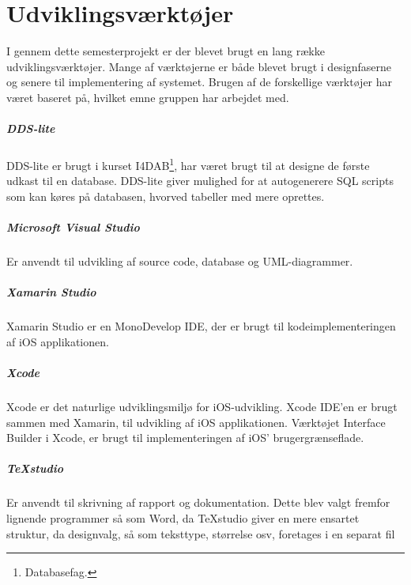 \chapter{Udviklingsværktøjer}

I gennem dette semesterprojekt er der blevet brugt en lang række udviklingsværktøjer. Mange af værktøjerne er både blevet brugt i designfaserne og senere til implementering af systemet. Brugen af de forskellige værktøjer har været baseret på, hvilket emne gruppen har arbejdet med.

\paragraph{DDS-lite}
DDS-lite er brugt i kurset I4DAB\footnote{Databasefag.}, har været brugt til at designe de første udkast til en database. DDS-lite giver mulighed for at autogenerere SQL scripts som kan køres på databasen, hvorved tabeller med mere oprettes.

\paragraph{Microsoft Visual Studio}
Er anvendt til udvikling af source code, database og UML-diagrammer.

\paragraph{Xamarin Studio}
Xamarin Studio er en MonoDevelop IDE, der er brugt til kodeimplementeringen af iOS applikationen.

\paragraph{Xcode}
Xcode er det naturlige udviklingsmiljø for iOS-udvikling. Xcode IDE'en er brugt sammen med Xamarin, til udvikling af iOS applikationen. Værktøjet Interface Builder i Xcode, er brugt til implementeringen af iOS' brugergrænseflade.

\paragraph{TeXstudio}
Er anvendt til skrivning af rapport og dokumentation. Dette blev valgt fremfor lignende programmer så som Word, da TeXstudio giver en mere ensartet struktur, da designvalg, så som teksttype, størrelse osv, foretages i en separat fil

